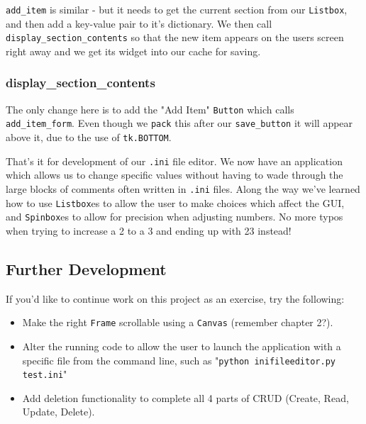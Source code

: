 \documentclass[a4paper,11pt,openany]{book}
\begin{document}
\vspace{5mm}

\lstinline[columns=fixed]{add_item} is similar - but it needs to get the current section from our \lstinline[columns=fixed]{Listbox}, and then add a key-value pair to it's dictionary. We then call \lstinline[columns=fixed]{display_section_contents} so that the new item appears on the users screen right away and we get its widget into our cache for saving.

\subsubsection{display\_section\_contents}

The only change here is to add the "Add Item" \lstinline[columns=fixed]{Button} which calls \lstinline[columns=fixed]{add_item_form}. Even though we \lstinline[columns=fixed]{pack} this after our \lstinline[columns=fixed]{save_button} it will appear above it, due to the use of \lstinline[columns=fixed]{tk.BOTTOM}.

\vspace{5mm}

That's it for development of our \lstinline[columns=fixed]{.ini} file editor. We now have an application which allows us to change specific values without having to wade through the large blocks of comments often written in \lstinline[columns=fixed]{.ini} files. Along the way we've learned how to use \lstinline[columns=fixed]{Listbox}es to allow the user to make choices which affect the GUI, and \lstinline[columns=fixed]{Spinbox}es to allow for precision when adjusting numbers. No more typos when trying to increase a 2 to a 3 and ending up with 23 instead!

\subsection{Further Development}

If you'd like to continue work on this project as an exercise, try the following:

\begin{itemize}
  \item Make the right \lstinline[columns=fixed]{Frame} scrollable using a \lstinline[columns=fixed]{Canvas} (remember chapter 2?).
  \item Alter the running code to allow the user to launch the application with a specific file from the command line, such as "\lstinline[columns=fixed]{python inifileeditor.py test.ini}"
  \item Add deletion functionality to complete all 4 parts of CRUD (Create, Read, Update, Delete). 
\end{itemize} 
\end{document}
